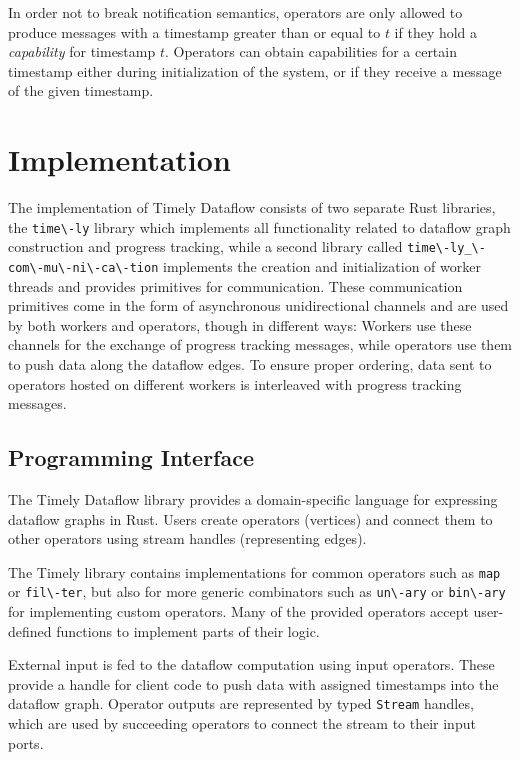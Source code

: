 In order not to break notification semantics, operators are only allowed to
produce messages with a timestamp greater than or equal to $t$ if they hold a
\emph{capability} for timestamp $t$. Operators can obtain capabilities for a certain
timestamp either during initialization of the system, or if they receive a
message of the given timestamp.
\clearpage
\section{Implementation}

The implementation of Timely Dataflow consists of two separate Rust libraries,
the \lstinline{time\-ly} library which implements all functionality related to
dataflow graph construction and progress tracking, while a second library
called \lstinline{time\-ly_\-com\-mu\-ni\-ca\-tion} implements the creation and
initialization of worker threads and provides primitives for communication.
These communication primitives come in the form of asynchronous unidirectional
channels and are used by both workers and operators, though in different ways:
Workers use these channels for the exchange of progress tracking messages, while
operators use them to push data along the dataflow edges. To ensure proper
ordering, data sent to operators hosted on different workers is interleaved
with progress tracking messages.

\subsection{Programming Interface}

The Timely Dataflow library provides a domain-specific language for expressing
dataflow graphs in Rust. Users create operators (vertices) and connect
them to other operators using stream handles (representing edges).

The Timely library contains implementations for common operators such as
\lstinline{map} or \lstinline{fil\-ter}, but also for more generic combinators
such as \lstinline{un\-ary} or \lstinline{bin\-ary} for implementing custom operators.
Many of the provided operators accept user-defined functions to implement
parts of their logic.

External input is fed to the dataflow computation using input operators. These
provide a handle for client code to push data with assigned timestamps into
the dataflow graph. Operator outputs are represented
by typed \lstinline{Stream} handles, which are used by succeeding operators
to connect the stream to their input ports.

